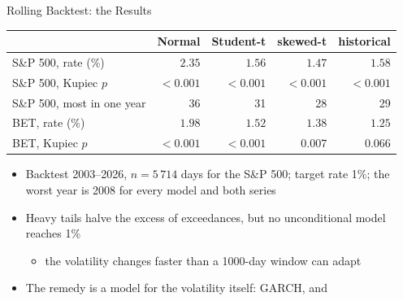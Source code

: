 \begin{frame}{Rolling Backtest: the Results}
\itemsize{\footnotesize}
\begin{center}
\footnotesize
\begin{tabular}{lrrrr}
\toprule
& Normal & Student-t & skewed-t & historical \\
\midrule
S\&P 500, rate (\%) & $2.35$ & $1.56$ & $1.47$ & $1.58$ \\
S\&P 500, Kupiec $p$ & $<0.001$ & $<0.001$ & $<0.001$ & $<0.001$ \\
S\&P 500, most in one year & 36 & 31 & 28 & 29 \\
BET, rate (\%) & $1.98$ & $1.52$ & $1.38$ & $1.25$ \\
BET, Kupiec $p$ & $<0.001$ & $<0.001$ & $0.007$ & $0.066$ \\
\bottomrule
\end{tabular}
\end{center}
\begin{itemize}
    \item Backtest 2003--2026, $n = 5\,714$ days for the S\&P 500; target rate 1\%; the worst year is 2008 for every model and both series
    \item Heavy tails halve the excess of exceedances, but no unconditional model reaches 1\%
    \begin{itemize}
        \item the volatility changes faster than a 1000-day window can adapt
    \end{itemize}
    \item The remedy is a model for the volatility itself: GARCH,  and 
\end{itemize}
\end{frame}

